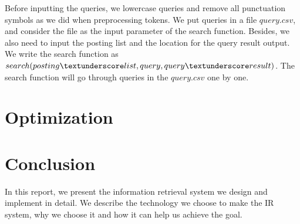 \documentclass[journal]{IEEEtran}
\begin{document}
Before inputting the queries, we lowercase queries and remove all punctuation symbols as we did when preprocessing tokens. We put queries in a file $query.csv$, and consider the file as the input parameter of the search function. Besides, we also need to input the posting list and the location for the query result output. We write the search function as $search(posting \textunderscore list, query, query \textunderscore result)$. The search function will go through queries in the $query.csv$ one by one. 

\section{Optimization}\label{optimization}


\section{Conclusion}
In this report, we present the information retrieval system we design and implement in detail. We describe the technology we choose to make the IR system, why we choose it and how it can help us achieve the goal.




{}


\end{document}
